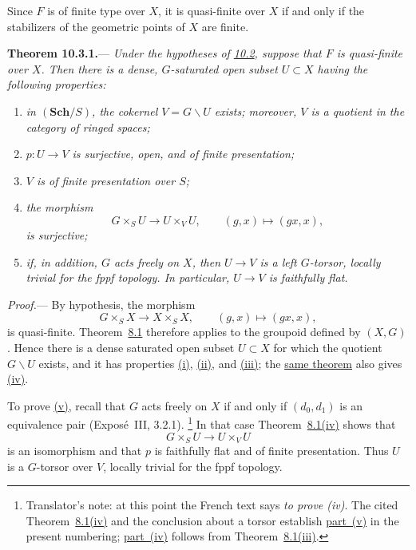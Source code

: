 Since \(F\) is of finite type over \(X\), it is quasi-finite over
\(X\) if and only if the stabilizers of the geometric points of \(X\)
are finite.

\medskip
{}\label{thm:sga3-V-10.3.1}%
\noindent\textbf{Theorem 10.3.1.}---%
\textit{Under the hypotheses of \hyperref[sec:sga3-V-10.2]{10.2},
suppose that \(F\) is quasi-finite over \(X\). Then there is a dense,
\(G\)-saturated open subset \(U\subset X\) having the following
properties:}
\begin{enumerate}
\item[(i)]\label{thm:sga3-V-10.3.1-i}%
  \textit{in \((\mathbf{Sch}/S)\), the cokernel
  \(V=G\backslash U\) exists; moreover, \(V\) is a quotient in the
  category of ringed spaces;}
\item[(ii)]\label{thm:sga3-V-10.3.1-ii}%
  \textit{\(p:U\to V\) is surjective, open, and of finite
  presentation;}
\item[(iii)]\label{thm:sga3-V-10.3.1-iii}%
  \textit{\(V\) is of finite presentation over \(S\);}
\item[(iv)]\label{thm:sga3-V-10.3.1-iv}%
  \textit{the morphism
  \[
    G\times_SU\longrightarrow U\times_VU,
    \qquad (g,x)\longmapsto(gx,x),
  \]
  is surjective;}
\item[(v)]\label{thm:sga3-V-10.3.1-v}%
  \textit{if, in addition, \(G\) acts freely on \(X\), then
  \(U\to V\) is a left \(G\)-torsor, locally trivial for the fppf
  topology. In particular, \(U\to V\) is faithfully flat.}%
\end{enumerate}

\noindent\textit{Proof.}---
By hypothesis, the morphism
\[
  G\times_SX\longrightarrow X\times_SX,
  \qquad (g,x)\longmapsto(gx,x),
\]
is quasi-finite. Theorem~\hyperref[thm:sga3-V-8.1]{8.1} therefore
applies to the groupoid defined by \((X,G)\). Hence there is a dense
saturated open subset \(U\subset X\) for which the quotient
\(G\backslash U\) exists, and it has properties \hyperref[thm:sga3-V-10.3.1-i]{(i)}, \hyperref[thm:sga3-V-10.3.1-ii]{(ii)}, and \hyperref[thm:sga3-V-10.3.1-iii]{(iii)};
the \hyperref[thm:sga3-V-8.1]{same theorem} also gives \hyperref[thm:sga3-V-10.3.1-iv]{(iv)}.

To prove \hyperref[thm:sga3-V-10.3.1-v]{(v)}, recall that \(G\) acts freely on \(X\) if and only if
\((d_0,d_1)\) is an equivalence pair (Expos\'e~III, 3.2.1).%
\footnote{\label{source-note:sga3-V-10.3.1-proof-part-v}Translator's note: at this point the French text says \emph{to prove (iv)}.
The cited Theorem~\hyperref[thm:sga3-V-8.1-iv]{8.1(iv)} and the conclusion about a torsor establish
\hyperref[thm:sga3-V-10.3.1-v]{part~(v)} in the present numbering; \hyperref[thm:sga3-V-10.3.1-iv]{part~(iv)} follows from
Theorem~\hyperref[thm:sga3-V-8.1-iii]{8.1(iii)}.}
In that case Theorem~\hyperref[thm:sga3-V-8.1-iv]{8.1(iv)} shows that
\[
  G\times_SU\longrightarrow U\times_VU
\]
is an isomorphism and that \(p\) is faithfully flat and of finite
presentation. Thus \(U\) is a \(G\)-torsor over \(V\), locally trivial
for the fppf topology.

